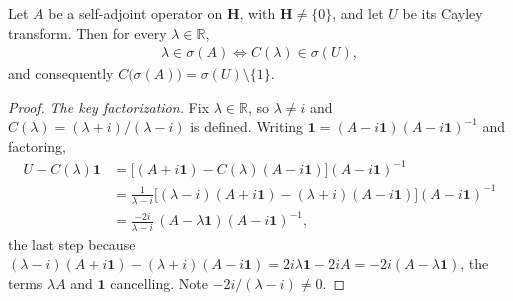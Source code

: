 \begin{lemma}
    \label{lmm:cayley-spectral-mapping}
    \leanok
    Let $A$ be a self-adjoint operator on $\mathbf{H}$, with $\mathbf{H} \ne \{0\}$, and let $U$ be its Cayley transform. Then for every $\lambda \in \mathbb{R}$,
    \begin{align}
        \lambda \in \sigma(A) \iff C(\lambda) \in \sigma(U),
    \end{align}
    and consequently $C\big( \sigma(A) \big) = \sigma(U) \setminus \{1\}$.
\end{lemma}
\begin{proof}
    \leanok
\textit{The key factorization.} Fix $\lambda \in \mathbb{R}$, so $\lambda \ne i$ and $C(\lambda) = (\lambda+i)/(\lambda-i)$ is defined. Writing $\mathbf{1} = (A-i\mathbf{1})(A-i\mathbf{1})^{-1}$ and factoring,
\begin{align}
    U - C(\lambda)\mathbf{1} &= \Big[ (A+i\mathbf{1}) - C(\lambda)(A - i\mathbf{1}) \Big](A-i\mathbf{1})^{-1} \\
                             &= \frac{1}{\lambda-i}\Big[ (\lambda-i)(A+i\mathbf{1}) - (\lambda+i)(A-i\mathbf{1}) \Big](A-i\mathbf{1})^{-1} \\
                             &= \frac{-2i}{\lambda-i}\,(A - \lambda\mathbf{1})(A-i\mathbf{1})^{-1},
\end{align}
the last step because $(\lambda-i)(A+i\mathbf{1}) - (\lambda+i)(A-i\mathbf{1}) = 2i\lambda\mathbf{1} - 2iA = -2i(A-\lambda\mathbf{1})$, the terms $\lambda A$ and $\mathbf{1}$ cancelling. Note $-2i/(\lambda-i) \ne 0$.


\end{proof}
